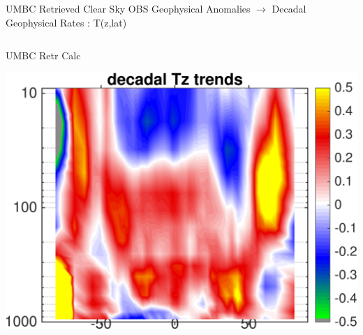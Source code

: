\documentclass[10pt,t]{beamer}
\begin{document}
\begin{frame}{UMBC Retrieved Clear Sky OBS Geophysical Anomalies $\rightarrow$ Decadal Geophysical Rates : T(z,lat)}
\begin{columns}
\begin{column}{0.45\columnwidth}
\begin{block}{\footnotesize UMBC Retr Calc}
\vspace{-0.1in}
\begin{center}
\includegraphics[width=\linewidth]{Figs/ClearAnom/umbc_clr_retr_cal_wv_rate_200209_201808.png}
\end{center}
\end{block}
\end{column}
\end{columns}

\end{frame}

\end{document}
